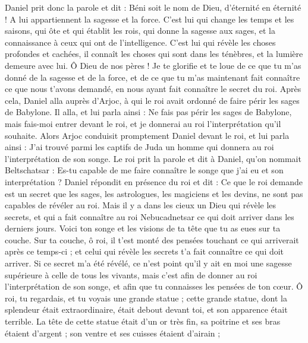 \begin{multicols}{2}
Daniel prit donc la parole et dit : Béni soit le nom de Dieu, d’éternité en éternité ! A lui appartiennent la sagesse et la force.
C’est lui qui change les temps et les saisons, qui ôte et qui établit les rois, qui donne la sagesse aux sages, et la connaissance à ceux qui ont de l'intelligence.
C'est lui qui révèle les choses profondes et cachées, il connaît les choses qui sont dans les ténèbres, et la lumière demeure avec lui.
Ô Dieu de nos pères ! Je te glorifie et te loue de ce que tu m'as donné de la sagesse et de la force, et de ce que tu m'as maintenant fait connaître ce que nous t'avons demandé, en nous ayant fait connaître le secret du roi.
Après cela, Daniel alla auprès d’Arjoc, à qui le roi avait ordonné de faire périr les sages de Babylone. Il alla, et lui parla ainsi : Ne fais pas périr les sages de Babylone, mais fais-moi entrer devant le roi, et je donnerai au roi l'interprétation qu'il souhaite.
Alors Arjoc conduisit promptement Daniel devant le roi, et lui parla ainsi : J'ai trouvé parmi les captifs de Juda un homme qui donnera au roi l'interprétation de son songe.
Le roi prit la parole et dit à Daniel, qu’on nommait Beltschatsar : Es-tu capable de me faire connaître le songe que j'ai eu et son interprétation ?
Daniel répondit en présence du roi et dit : Ce que le roi demande est un secret que les sages, les astrologues, les magiciens et les devins, ne sont pas capables de révéler au roi.
Mais il y a dans les cieux un Dieu qui révèle les secrets, et qui a fait connaître au roi Nebucadnetsar ce qui doit arriver dans les derniers jours. Voici ton songe et les visions de ta tête que tu as eues sur ta couche.
Sur ta couche, ô roi, il t’est monté des pensées touchant ce qui arriverait après ce temps-ci ; et celui qui révèle les secrets t'a fait connaître ce qui doit arriver.
Si ce secret m'a été révélé, ce n’est point qu’il y ait en moi une sagesse supérieure à celle de tous les vivants, mais c’est afin de donner au roi l'interprétation de son songe, et afin que tu connaisses les pensées de ton cœur.
Ô roi, tu regardais, et tu voyais une grande statue ; cette grande statue, dont la splendeur était extraordinaire, était debout devant toi, et son apparence était terrible.
La tête de cette statue était d'un or très fin, sa poitrine et ses bras étaient d'argent ; son ventre et ses cuisses étaient d'airain ;

\end{multicols}
